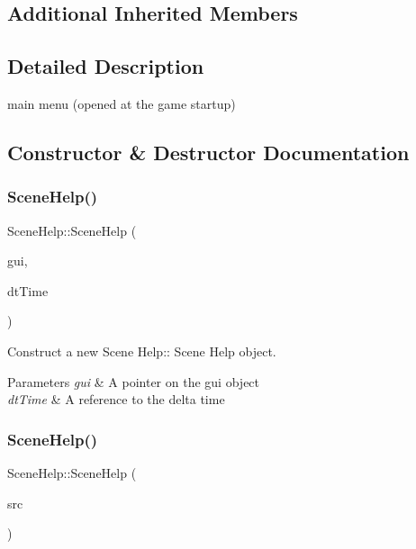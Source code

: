 \subsection*{Additional Inherited Members}


\subsection{Detailed Description}
main menu (opened at the game startup) 

\subsection{Constructor \& Destructor Documentation}
\mbox{\label{class_scene_help_aaae713d2e50fed0d067b5647697a8967}} 
\subsubsection{\texorpdfstring{Scene\+Help()}{SceneHelp()}\hspace{0.1cm}{\footnotesize\ttfamily [1/2]}}
{\footnotesize\ttfamily Scene\+Help\+::\+Scene\+Help (\begin{DoxyParamCaption}\item[{\hyperlink{class_gui}{Gui} $\ast$}]{gui,  }\item[{float const \&}]{dt\+Time }\end{DoxyParamCaption})}



Construct a new Scene Help\+:\+: Scene Help object. 


\begin{DoxyParams}{Parameters}
{\em gui} & A pointer on the gui object \\
\hline
{\em dt\+Time} & A reference to the delta time \\
\hline
\end{DoxyParams}
\mbox{\label{class_scene_help_a5ace5269e4c0405184568ff206a456b6}} 
\subsubsection{\texorpdfstring{Scene\+Help()}{SceneHelp()}\hspace{0.1cm}{\footnotesize\ttfamily [2/2]}}
{\footnotesize\ttfamily Scene\+Help\+::\+Scene\+Help (\begin{DoxyParamCaption}\item[{\hyperlink{class_scene_help}{Scene\+Help} const \&}]{src }\end{DoxyParamCaption})}



